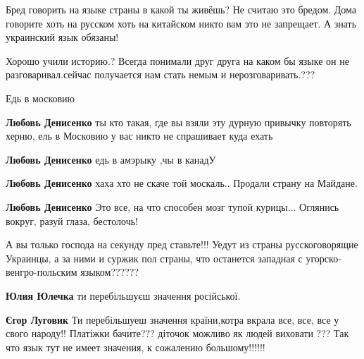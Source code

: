 \begin{itemize}
Бред говорить на языке страны в какой ты живёшь? Не считаю это бредом. Дома
говорите хоть на русском хоть на китайском никто вам это не запрещает. А знать
украинский язык обязаны!

Хорошо учили историю.? Всегда понимали друг друга на каком бы языке он не
разговаривал.сейчас получается нам стать немым и нерозговаривать.???

Едь в московию

\begin{itemize}
\textbf{Любовь Денисенко} ты кто такая, где вы взяли эту дурную привычку повторять херню, ель в Московию у вас никто не спрашивает куда ехать

\textbf{Любовь Денисенко} едь в амэрыку ,чы в канадУ

\textbf{Любовь Денисенко} хаха хто не скаче той москаль.. Продали страну на Майдане.

\textbf{Любовь Денисенко}
Это все, на что способен мозг тупой курицы... Оглянись вокруг, разуй глаза, бестолочь!
\end{itemize}


А вы только господа на секунду пред ставьте!!! Уедут из страны русскоговорящие
Украинцы, а за ними и суржик пол страны, что останется западная с
угорско-венгро-польским языком??????

\begin{itemize}
\textbf{Юлия Юлечка} ти перебільшуєш значення російської.

\textbf{Єгор Луговик} Ти перебільшуеш значення країни,котра вкрала все, все, все у свого народу!!
Платіжки бачите??? діточок можливо як людей виховати ???
Так что язык тут не имеет значения, к сожалению большому!!!!!!


\end{itemize}
\end{itemize}
